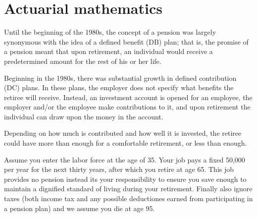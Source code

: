 \chapter{Actuarial mathematics}
Until the beginning of the 1980s, the concept of a pension was largely
synonymous with the idea of a defined benefit (DB) plan; that is, the promise
of a pension meant that upon retirement, an individual would receive a
predetermined amount for the rest of his or her life.

Beginning in the 1980s, there was substantial growth in defined contribution
(DC) plans. In these plans, the employer does not specify what benefits the
retiree will receive. Instead, an investment account is opened for an employee,
the employer and/or the employee make contributions to it, and upon retirement
the individual can draw upon the money in the account.

Depending on how much is contributed and how well it is invested, the retiree
could have more than enough for a comfortable retirement, or less than enough.

Assume you enter the labor force at the age of 35. Your job pays a fixed 50,000
per year for the next thirty years, after which you retire at age 65. This job
provides no pension instead its your responsibility to ensure you save enough
to maintain a dignified standard of living during your retirement. Finally also
ignore taxes (both income tax and any possible deductiones earned from
participating in a pension plan) and we assume you die at age 95.
